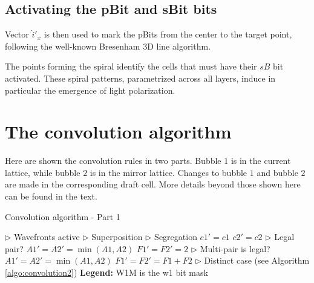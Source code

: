 \documentclass[12pt,english]{article}
\begin{document}
\subsection{Activating the pBit and sBit bits}
Vector $\hat{i}'_x$ is then used to mark the pBits from the center to the target point, following the well-known Bresenham 3D line algorithm. 

The points forming the spiral identify the cells that must have their $sB$ bit activated. These spiral patterns, parametrized across all layers, induce in particular the emergence of light polarization.

\newpage{}

\section{The convolution algorithm \label{sec:algorithms}}
Here are shown the convolution rules in two parts. Bubble $1$ is in the current lattice, while bubble $2$ is in the mirror lattice. Changes to bubble $1$ and bubble $2$ are made in the corresponding draft cell. More details beyond those shown here can be found in the text.

\begin{algorithm}
    \caption{Convolution algorithm - Part 1}
    \label{algo:convolution1}
    \begin{algorithmic}[1]
            \State $\triangleright$ Wavefronts active 
                \State $\triangleright$ Superposition
                    \State $\triangleright$ Segregation
                        \State $c1'=c1$
                    \EndIf   
                        \State $c2'=c2$
                    \EndIf   
                    \State $\triangleright$ Legal pair?
                        \State $A1'=A2'=\min(A1, A2)$
                        \State $F1'=F2'=2$
                    \EndIf   
                    \State $\triangleright$ Multi-pair is legal?
                        \State $A1'=A2'=\min(A1, A2)$
                        \State $F1'=F2'=F1+F2$
                    \EndIf   
                \EndIf   
            \Else
                \State $\triangleright$ Distinct case
                \State (see Algorithm \ref{algo:convolution2})
            \EndIf   
        \EndIf   
        \State  %
        \State \textbf{Legend:}
        \State W1M is the w1 bit mask

    \end{algorithmic}
\end{algorithm}
\end{document}
